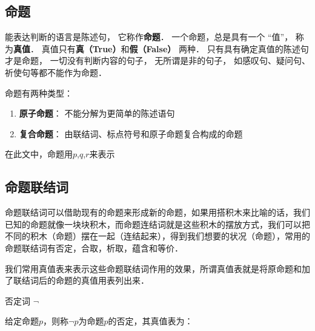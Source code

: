 
\begin{issues}
\issueTODO
\end{issues}

\subsection{命题}
能表达判断的语言是陈述句， 它称作\textbf{命题}． 一个命题，总是具有一个 “值”， 称为\textbf{真值}． 真值只有\textbf{真（True）}和\textbf{假（False）} 两种． 只有具有确定真值的陈述句才是命题， 一切没有判断内容的句子， 无所谓是非的句子， 如感叹句、疑问句、祈使句等都不能作为命题．

命题有两种类型：
\begin{enumerate}
\item \textbf{原子命题}： 不能分解为更简单的陈述语句
\item \textbf{复合命题}： 由联结词、标点符号和原子命题复合构成的命题
\end{enumerate} 
在此文中，命题用$p$,$q$,$r$来表示

\subsection{命题联结词}
命题联结词可以借助现有的命题来形成新的命题，如果用搭积木来比喻的话，我们已知的命题就像一块块积木，而命题连结词就是这些积木的摆放方式，我们可以把不同的积木（命题）摆在一起（连结起来），得到我们想要的状况（命题），常用的命题联结词有否定，合取，析取，蕴含和等价．

我们常用真值表来表示这些命题联结词作用的效果，所谓真值表就是将原命题和加了联结词后的命题的真值用表列出来．
\begin{definition}{否定词 $\neg$} \end{definition} 
给定命题$p$，则称$\neg p$为命题$p$的否定，其真值表为：

